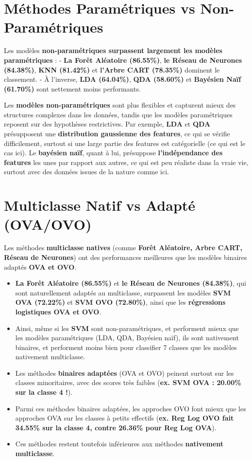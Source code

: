 \documentclass[
]{article}
\providecommand{\tightlist}{%
  \setlength{\itemsep}{0pt}\setlength{\parskip}{0pt}}\usepackage{longtable,booktabs,array}
\begin{document}
\section{Méthodes Paramétriques vs
Non-Paramétriques}\label{muxe9thodes-paramuxe9triques-vs-non-paramuxe9triques}

Les modèles \textbf{non-paramétriques surpassent largement les modèles
paramétriques} : - \textbf{La Forêt Aléatoire (86.55\%)}, \textbf{le
Réseau de Neurones (84.38\%)}, \textbf{KNN (81.42\%)} et \textbf{l'Arbre
CART (78.35\%)} dominent le classement. - À l'inverse, \textbf{LDA
(64.04\%)}, \textbf{QDA (58.60\%)} et \textbf{Bayésien Naïf (61.70\%)}
sont nettement moins performants.

Les \textbf{modèles non-paramétriques} sont plus flexibles et capturent
mieux des structures complexes dans les données, tandis que les modèles
paramétriques reposent sur des hypothèses restrictives. Par exemple,
\textbf{LDA} et \textbf{QDA} présupposent une \textbf{distribution
gaussienne des features}, ce qui se vérifie difficilement, surtout si
une large partie des features est catégorielle (ce qui est le cas ici).
Le \textbf{bayésien naïf}, quant à lui, présuppose
\textbf{l'indépendance des features} les unes par rapport aux autres, ce
qui est peu réaliste dans la vraie vie, surtout avec des données issues
de la nature comme ici.

\section{Multiclasse Natif vs Adapté
(OVA/OVO)}\label{multiclasse-natif-vs-adaptuxe9-ovaovo}

Les méthodes \textbf{multiclasse natives} (comme \textbf{Forêt
Aléatoire, Arbre CART, Réseau de Neurones}) ont des performances
meilleures que les modèles binaires adaptés \textbf{OVA et OVO}.

\begin{itemize}
\tightlist
\item
  \textbf{La Forêt Aléatoire (86.55\%)} et \textbf{le Réseau de Neurones
  (84.38\%)}, qui sont naturellement adaptés au multiclasse, surpassent
  les modèles \textbf{SVM OVA (72.22\%)} et \textbf{SVM OVO (72.80\%)},
  ainsi que les \textbf{régressions logistiques OVA et OVO}.
\item
  Ainsi, même si les \textbf{SVM} sont non-paramétriques, et performent
  mieux que les modèles paramétriques (LDA, QDA, Bayésien naïf), ils
  sont nativement binaires, et performent moins bien pour classifier 7
  classes que les modèles nativement multiclasse.
\item
  Les méthodes \textbf{binaires adaptées} (OVA et OVO) peinent surtout
  sur les classes minoritaires, avec des scores très faibles
  (\textbf{ex. SVM OVA : 20.00\% sur la classe 4 !}).
\item
  Parmi ces méthodes binaires adaptées, les approches OVO font mieux que
  les approches OVA sur les classes à petits effectifs (\textbf{ex. Reg
  Log OVO fait 34.55\% sur la classe 4, contre 26.36\% pour Reg Log
  OVA}).
\item
  Ces méthodes restent toutefois inférieures aux méthodes
  \textbf{nativement multiclasse}.
\end{itemize}
\end{document}
